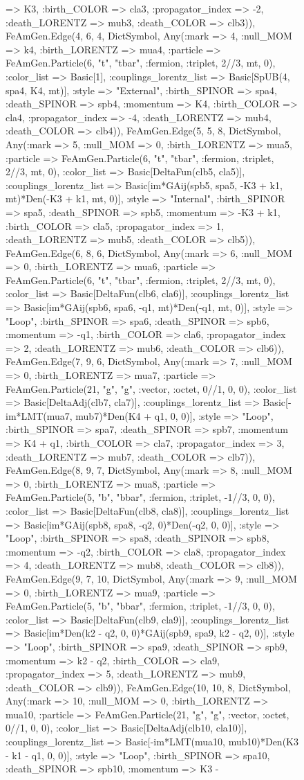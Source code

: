 \documentclass{revtex4}
\begin{document}
\begin{figure}[!htb]
\begin{center}
{=> K3, :birth_COLOR => cla3, :propagator_index => -2, :death_LORENTZ => mub3, :death_COLOR => clb3)), FeAmGen.Edge(4, 6, 4, Dict{Symbol, Any}(:mark => 4, :null_MOM => k4, :birth_LORENTZ => mua4, :particle => FeAmGen.Particle(6, "t", "tbar", :fermion, :triplet, 2//3, mt, 0), :color_list => Basic[1], :couplings_lorentz_list => Basic[SpUB(4, spa4, K4, mt)], :style => "External", :birth_SPINOR => spa4, :death_SPINOR => spb4, :momentum => K4, :birth_COLOR => cla4, :propagator_index => -4, :death_LORENTZ => mub4, :death_COLOR => clb4)), FeAmGen.Edge(5, 5, 8, Dict{Symbol, Any}(:mark => 5, :null_MOM => 0, :birth_LORENTZ => mua5, :particle => FeAmGen.Particle(6, "t", "tbar", :fermion, :triplet, 2//3, mt, 0), :color_list => Basic[DeltaFun(clb5, cla5)], :couplings_lorentz_list => Basic[im*GAij(spb5, spa5, -K3 + k1, mt)*Den(-K3 + k1, mt, 0)], :style => "Internal", :birth_SPINOR => spa5, :death_SPINOR => spb5, :momentum => -K3 + k1, :birth_COLOR => cla5, :propagator_index => 1, :death_LORENTZ => mub5, :death_COLOR => clb5)), FeAmGen.Edge(6, 8, 6, Dict{Symbol, Any}(:mark => 6, :null_MOM => 0, :birth_LORENTZ => mua6, :particle => FeAmGen.Particle(6, "t", "tbar", :fermion, :triplet, 2//3, mt, 0), :color_list => Basic[DeltaFun(clb6, cla6)], :couplings_lorentz_list => Basic[im*GAij(spb6, spa6, -q1, mt)*Den(-q1, mt, 0)], :style => "Loop", :birth_SPINOR => spa6, :death_SPINOR => spb6, :momentum => -q1, :birth_COLOR => cla6, :propagator_index => 2, :death_LORENTZ => mub6, :death_COLOR => clb6)), FeAmGen.Edge(7, 9, 6, Dict{Symbol, Any}(:mark => 7, :null_MOM => 0, :birth_LORENTZ => mua7, :particle => FeAmGen.Particle(21, "g", "g", :vector, :octet, 0//1, 0, 0), :color_list => Basic[DeltaAdj(clb7, cla7)], :couplings_lorentz_list => Basic[-im*LMT(mua7, mub7)*Den(K4 + q1, 0, 0)], :style => "Loop", :birth_SPINOR => spa7, :death_SPINOR => spb7, :momentum => K4 + q1, :birth_COLOR => cla7, :propagator_index => 3, :death_LORENTZ => mub7, :death_COLOR => clb7)), FeAmGen.Edge(8, 9, 7, Dict{Symbol, Any}(:mark => 8, :null_MOM => 0, :birth_LORENTZ => mua8, :particle => FeAmGen.Particle(5, "b", "bbar", :fermion, :triplet, -1//3, 0, 0), :color_list => Basic[DeltaFun(clb8, cla8)], :couplings_lorentz_list => Basic[im*GAij(spb8, spa8, -q2, 0)*Den(-q2, 0, 0)], :style => "Loop", :birth_SPINOR => spa8, :death_SPINOR => spb8, :momentum => -q2, :birth_COLOR => cla8, :propagator_index => 4, :death_LORENTZ => mub8, :death_COLOR => clb8)), FeAmGen.Edge(9, 7, 10, Dict{Symbol, Any}(:mark => 9, :null_MOM => 0, :birth_LORENTZ => mua9, :particle => FeAmGen.Particle(5, "b", "bbar", :fermion, :triplet, -1//3, 0, 0), :color_list => Basic[DeltaFun(clb9, cla9)], :couplings_lorentz_list => Basic[im*Den(k2 - q2, 0, 0)*GAij(spb9, spa9, k2 - q2, 0)], :style => "Loop", :birth_SPINOR => spa9, :death_SPINOR => spb9, :momentum => k2 - q2, :birth_COLOR => cla9, :propagator_index => 5, :death_LORENTZ => mub9, :death_COLOR => clb9)), FeAmGen.Edge(10, 10, 8, Dict{Symbol, Any}(:mark => 10, :null_MOM => 0, :birth_LORENTZ => mua10, :particle => FeAmGen.Particle(21, "g", "g", :vector, :octet, 0//1, 0, 0), :color_list => Basic[DeltaAdj(clb10, cla10)], :couplings_lorentz_list => Basic[-im*LMT(mua10, mub10)*Den(K3 - k1 - q1, 0, 0)], :style => "Loop", :birth_SPINOR => spa10, :death_SPINOR => spb10, :momentum => K3 - }
\end{center}
\end{figure}
\end{document}
